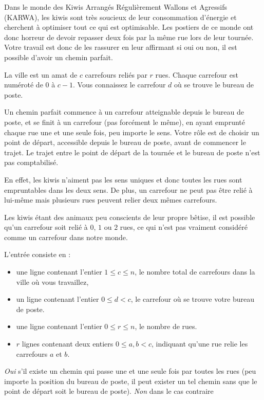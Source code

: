 

Dans le monde des Kiwis Arrangés Régulièrement Wallons et Agressifs (KARWA), les kiwis sont très soucieux de leur consommation d'énergie et cherchent à optimiser tout ce qui est optimisable. Les postiers de ce monde ont donc horreur de devoir repasser deux fois par la même rue lors de leur tournée. Votre travail est donc de les rassurer en leur affirmant si oui ou non, il est possible d'avoir un chemin parfait.

La ville est un amat de $c$ carrefours reliés par $r$ rues. Chaque carrefour est numéroté de $0$ à $c-1$. Vous connaissez le carrefour $d$ où se trouve le bureau de poste.

Un chemin parfait commence à un carrefour atteignable depuis le bureau de poste, et se finit à un carrefour (pas forcément le même), en ayant emprunté chaque rue une et une seule fois, peu importe le sens. Votre rôle est de choisir un point de départ, accessible depuis le bureau de poste, avant de commencer le trajet. Le trajet entre le point de départ de la tournée et le bureau de poste n'est pas comptabilisé.

En effet, les kiwis n'aiment pas les sens uniques et donc toutes les rues sont empruntables dans les deux sens. De plus, un carrefour ne peut pas être relié à lui-même mais plusieurs rues peuvent relier deux mêmes carrefours.

Les kiwis étant des animaux peu conscients de leur propre bêtise, il est possible qu'un carrefour soit relié à $0$, $1$ ou $2$ rues, ce qui n'est pas vraiment considéré comme un carrefour dans notre monde.

\begin{Input}
    L'entrée consiste en :
    \begin{itemize}
        \item une ligne contenant l'entier $1 \leq c \leq n$, le nombre total de carrefours dans la ville où vous travaillez,
        \item un ligne contenant l'entier $0\leq d < c$, le carrefour où se trouve votre bureau de poste.
        \item une ligne contenant l'entier $0 \leq r \leq n$, le nombre de rues.
        \item $r$ lignes contenant deux entiers $0\leq a,b < c$, indiquant qu'une rue relie les carrefours $a$ et $b$.
    \end{itemize}
\end{Input}

\begin{Output}
    \emph{Oui} s'il existe un chemin qui passe une et une seule fois par toutes les rues (peu importe la position du bureau de poste, il peut exister un tel chemin sans que le point de départ soit le bureau de poste). \emph{Non} dans le cas contraire
\end{Output}
